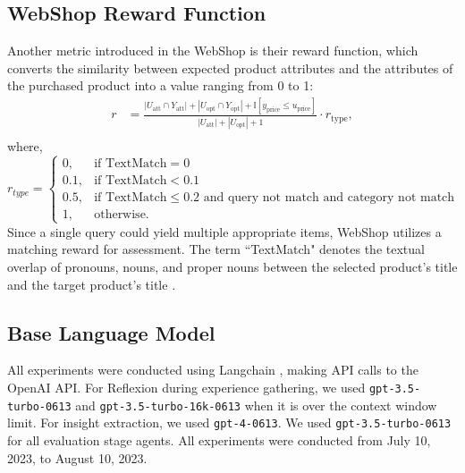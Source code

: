 \documentclass[letterpaper]{article} %
\begin{document}
\subsection{WebShop Reward Function}
\label{sec:webshop_reward_function}
Another metric introduced in the WebShop \cite{yao2022webshop} is their reward function, which converts the similarity between expected product attributes and the attributes of the purchased product into a value ranging from 0 to 1:
\begin{equation}
\begin{split}
r & = \frac{\left|U_{\text{att}} \cap Y_{\text{att}}\right| + \left|U_{\text{opt}} \cap Y_{\text{opt}}\right| + \mathbb{I}\left[y_{\text{price}} \leq u_{\text{price}}\right]}{\left|U_{\text{att}}\right| + \left|U_{\text{opt}}\right| + 1}\cdot r_{\text{type}}, \\
\end{split}
\label{eq:reward_function}
\end{equation}
where,
\begin{equation}
r_{type} = 
\begin{cases}
    0, & \text{if }\text{TextMatch} = 0 \\
    0.1, & \text{if }\text{TextMatch} < 0.1 \\
    0.5, & \text{if }\text{TextMatch} \leq 0.2 \text{ and query not match and category not match} \\
    1, & \text{otherwise.}
\end{cases}
\label{eq:reward_type_function}
\end{equation}
Since a single query could yield multiple appropriate items, WebShop utilizes a matching reward for assessment. The term ``TextMatch" denotes the textual overlap of pronouns, nouns, and proper nouns between the selected product's title and the target product's title \cite{liu2023agentbench}.

\subsection{Base Language Model}
All experiments were conducted using Langchain \cite{chase2023langchain}, making API calls to the OpenAI API. For Reflexion during experience gathering, we used \texttt{gpt-3.5-turbo-0613} and \texttt{gpt-3.5-turbo-16k-0613} when it is over the context window limit. For insight extraction, we used \texttt{gpt-4-0613}. We used \texttt{gpt-3.5-turbo-0613} for all evaluation stage agents. All experiments were conducted from July 10, 2023, to August 10, 2023.
\end{document}
